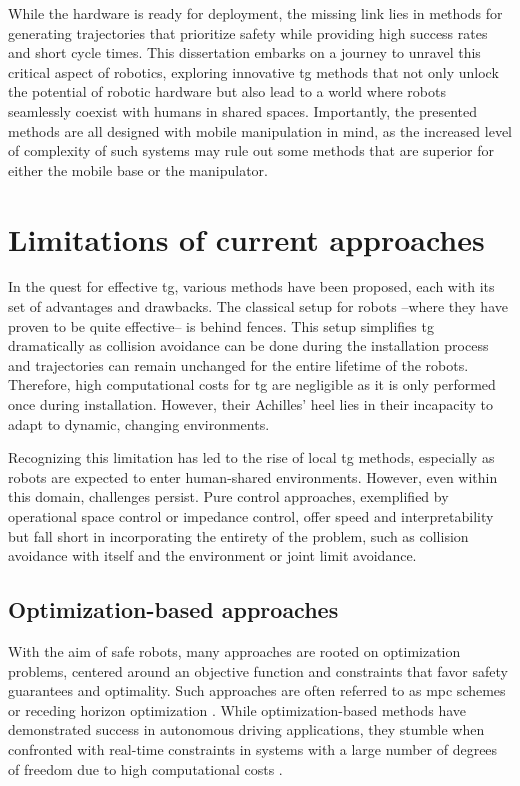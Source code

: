 While the hardware is ready for deployment, the
missing link lies in methods for generating trajectories
that prioritize safety while providing high success rates
and short cycle times.
This dissertation embarks on a journey to unravel this
critical aspect of robotics, exploring innovative \ac{tg}
methods that not only unlock the potential of
robotic hardware but also lead to a world where robots
seamlessly coexist with humans in shared spaces.
Importantly, the presented methods are all designed with
mobile manipulation in mind, as the increased level of
complexity of such systems may rule out some methods that
are superior for either the mobile base or the manipulator.

\section{Limitations of current approaches}
\label{sec:limitations_of_current_approaches}

In the quest for effective \ac{tg}, various
methods have been proposed, each with its set of advantages and
drawbacks.
The classical setup for robots --where they have
proven to be quite effective-- is behind fences. This setup
simplifies \ac{tg} dramatically as collision
avoidance can be done during the installation process and
trajectories can remain unchanged for the entire lifetime of
the robots. Therefore, high computational costs for
\ac{tg} are negligible as it is only performed
once during installation. However, their Achilles' heel lies
in their incapacity to adapt to dynamic, changing
environments.

Recognizing this limitation has led to the rise of local
\ac{tg} methods, especially as robots are
expected to enter human-shared environments. However, even
within this domain, challenges persist. Pure control
approaches, exemplified by operational space control or
impedance control, offer speed and interpretability but fall
short in incorporating the entirety of the problem, such as
collision avoidance with itself and the environment or
joint limit avoidance.


\subsection*{Optimization-based approaches}
With the aim of safe robots, many approaches are
rooted on optimization problems, centered around an
objective function and constraints that favor safety
guarantees and optimality. Such approaches are often
referred to as \acf{mpc} schemes or receding
horizon optimization \cite{hewing2020learning}. While
optimization-based methods have demonstrated success in
autonomous driving applications, they stumble when
confronted with real-time constraints in systems with
a large number of degrees of freedom due to high computational costs
\cite{spahn2021coupled}.

